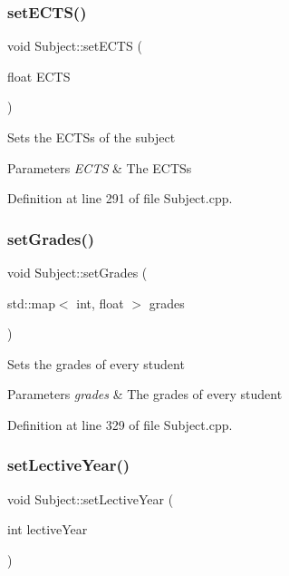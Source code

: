\subsubsection{\texorpdfstring{set\+E\+C\+T\+S()}{setECTS()}}
{\footnotesize\ttfamily void Subject\+::set\+E\+C\+TS (\begin{DoxyParamCaption}\item[{float}]{E\+C\+TS }\end{DoxyParamCaption})}

Sets the E\+C\+T\+Ss of the subject 
\begin{DoxyParams}{Parameters}
{\em E\+C\+TS} & The E\+C\+T\+Ss \\
\hline
\end{DoxyParams}


Definition at line 291 of file Subject.\+cpp.

\mbox{\label{classSubject_af4e5480d466cd44214dd006bec2f891a}} 
\subsubsection{\texorpdfstring{set\+Grades()}{setGrades()}}
{\footnotesize\ttfamily void Subject\+::set\+Grades (\begin{DoxyParamCaption}\item[{std\+::map$<$ int, float $>$}]{grades }\end{DoxyParamCaption})}

Sets the grades of every student 
\begin{DoxyParams}{Parameters}
{\em grades} & The grades of every student \\
\hline
\end{DoxyParams}


Definition at line 329 of file Subject.\+cpp.

\mbox{\label{classSubject_acf269c84f61028d400856b94677e6422}} 
\subsubsection{\texorpdfstring{set\+Lective\+Year()}{setLectiveYear()}}
{\footnotesize\ttfamily void Subject\+::set\+Lective\+Year (\begin{DoxyParamCaption}\item[{int}]{lective\+Year }\end{DoxyParamCaption})}

